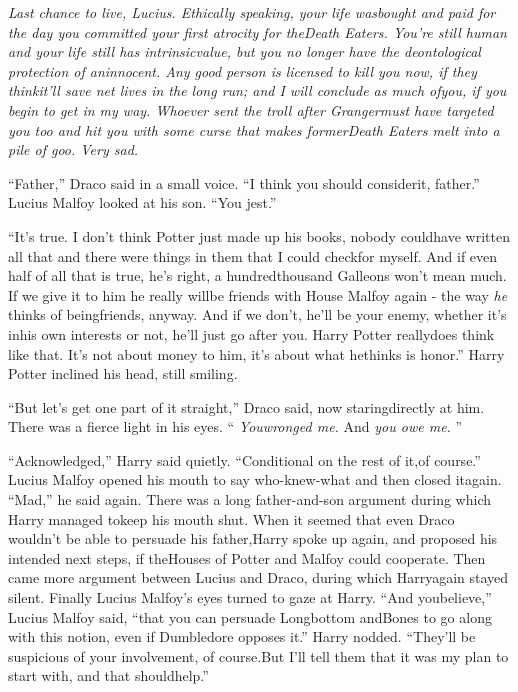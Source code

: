 \emph{Last chance to live, Lucius. Ethically speaking, your life wasbought and paid for the day you committed your first atrocity for theDeath Eaters. You're still human and your life still has intrinsicvalue, but you no longer have the deontological protection of aninnocent. Any good person is licensed to kill you now, if they thinkit'll save net lives in the long run; and I will conclude as much ofyou, if you begin to get in my way. Whoever sent the troll after Grangermust have targeted you too and hit you with some curse that makes formerDeath Eaters melt into a pile of goo. Very sad.}

``Father,'' Draco said in a small voice. ``I think you should considerit, father.''
Lucius Malfoy looked at his son. ``You jest.''

``It's true. I don't think Potter just made up his books, nobody couldhave written all that and there were things in them that I could checkfor myself. And if even half of all that is true, he's right, a hundredthousand Galleons won't mean much. If we give it to him he really willbe friends with House Malfoy again - the way \emph{he} thinks of beingfriends, anyway. And if we don't, he'll be your enemy, whether it's inhis own interests or not, he'll just go after you. Harry Potter reallydoes think like that. It's not about money to him, it's about what hethinks is honor.''
Harry Potter inclined his head, still smiling.

``But let's get one part of it straight,'' Draco said, now staringdirectly at him. There was a fierce light in his eyes. `` \emph{Youwronged me.} And \emph{you owe me.} ''

``Acknowledged,'' Harry said quietly. ``Conditional on the rest of it,of course.''
Lucius Malfoy opened his mouth to say who-knew-what and then closed itagain. ``Mad,'' he said again.
There was a long father-and-son argument during which Harry managed tokeep his mouth shut.
When it seemed that even Draco wouldn't be able to persuade his father,Harry spoke up again, and proposed his intended next steps, if theHouses of Potter and Malfoy could cooperate.
Then came more argument between Lucius and Draco, during which Harryagain stayed silent.
Finally Lucius Malfoy's eyes turned to gaze at Harry. ``And youbelieve,'' Lucius Malfoy said, ``that you can persuade Longbottom andBones to go along with this notion, even if Dumbledore opposes it.''
Harry nodded. ``They'll be suspicious of your involvement, of course.But I'll tell them that it was my plan to start with, and that shouldhelp.''

